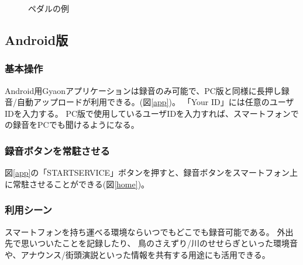 \begin{figure}[H]
\centering
{}
\caption{ペダルの例}
\label{pedal}
\end{figure}


\subsection{Android版}

\subsubsection{基本操作}
Android用Gyaonアプリケーションは録音のみ可能で、PC版と同様に長押し録音/自動アップロードが利用できる。(図\ref{app})。
「Your ID」には任意のユーザIDを入力する。
PC版で使用しているユーザIDを入力すれば、スマートフォンでの録音をPCでも聞けるようになる。

\subsubsection{録音ボタンを常駐させる}
図\ref{app}の「STARTSERVICE」ボタンを押すと、録音ボタンをスマートフォン上に常駐させることができる(図\ref{home})。

\subsubsection{利用シーン}
スマートフォンを持ち運べる環境ならいつでもどこでも録音可能である。
外出先で思いついたことを記録したり、
鳥のさえずり/川のせせらぎといった環境音や、アナウンス/街頭演説といった情報を共有する用途にも活用できる。

